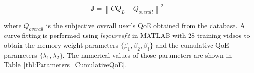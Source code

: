 \begin{equation}
    \bm{J} = \left \| CQ_{L} - Q_{overall} \right \|^{2}
\end{equation}


where $Q_{overall}$ is the subjective overall user's QoE obtained from the database. A curve fitting is performed using \textit{lsqcurvefit} in MATLAB \cite{MATLAB} with 28 training videos to obtain the memory weight parameters $\{\beta_{1}, \beta_{2}, \beta_{3}\}$ and the cumulative QoE parameters $\{ \lambda_{1}, \lambda_{2} \}$. The numerical values of those parameters are shown in Table~\ref{tbl:Parameters_CumulativeQoE}.


    
